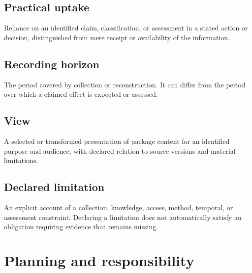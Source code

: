 \documentclass[11pt,a4paper]{article}
\begin{document}
\subsection{Practical uptake}
Reliance on an identified claim, classification, or assessment in a stated action or decision, distinguished from mere receipt or availability of the information.

\subsection{Recording horizon}
The period covered by collection or reconstruction. It can differ from the period over which a claimed effect is expected or assessed.

\subsection{View}
A selected or transformed presentation of package content for an identified purpose and audience, with declared relation to source versions and material limitations.

\subsection{Declared limitation}
An explicit account of a collection, knowledge, access, method, temporal, or assessment constraint. Declaring a limitation does not automatically satisfy an obligation requiring evidence that remains missing.

\section{Planning and responsibility}
\end{document}
